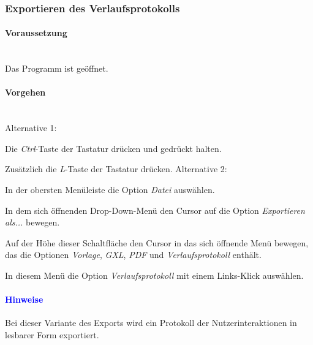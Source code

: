 \documentclass[enabledeprecatedfontcommands,fontsize=11pt,paper=a4,twoside]{scrartcl}
\newcounter{one}
\newcounter{two}[one]
\newcommand*{\hint}{\paragraph{\textcolor{blue}{Hinweise}}}
\newcommand*{\condition}{\paragraph{Voraussetzung}$\;$ \vspace{0.2cm}\\}
\newcommand*{\actions}{\paragraph{Vorgehen} $\;$\vspace{0.2cm}\\}
\newcommand*{\aOne}{\textcolor{bbe}{Alternative 1:}}
\newcommand*{\aTwo}{\textcolor{bbe}{Alternative 2:}}
\let\tempone\itemize
\let\temptwo\enditemize
\renewenvironment{itemize}{\tempone\addtolength{\itemsep}{-10.0pt}}{\temptwo}
\let\origenumerate\enumerate
\let\origendenumerate\endenumerate
\renewenvironment{enumerate}{\origenumerate \addtolength{\itemsep}{-10.0pt}}{\origendenumerate}
\begin{document}
\subsubsection{Exportieren des Verlaufsprotokolls}
		\condition 	
		Das Programm ist geöffnet.
		\actions
		\aOne
		\begin{enumerate}
				\item Die \textit{Ctrl}-Taste der Tastatur drücken und gedrückt halten.
				\item Zusätzlich die \textit{L}-Taste der Tastatur drücken.
		\end{enumerate}				
		\aTwo
		\begin{enumerate}
				\item In der obersten Menüleiste die Option \textit{Datei} auswählen. 
				\item In dem sich öffnenden Drop-Down-Menü den Cursor auf die Option \textit{Exportieren als...} bewegen.
				\item Auf der Höhe dieser Schaltfläche den Cursor in das sich öffnende Menü bewegen, das die Optionen \textit{Vorlage}, \textit{GXL}, \textit{PDF} und \textit{Verlaufsprotokoll} enthält.
				\item In diesem Menü die Option \textit{Verlaufsprotokoll} mit einem Links-Klick auswählen.
		\end{enumerate}		
		\hint
		\begin{itemize}
				\item Bei dieser Variante des Exports wird ein Protokoll der Nutzerinteraktionen in lesbarer Form exportiert. \\
		\end{itemize}

\end{document}
